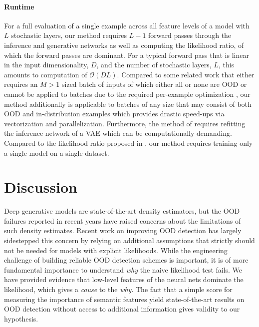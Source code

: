 {\paragraph{Runtime} For a full evaluation of a single example across all feature levels of a model with $L$ stochastic layers, our method requires $L-1$ forward passes through the inference and generative networks as well as computing the likelihood ratio, of which the forward passes are dominant.
For a typical forward pass that is linear in the input dimensionality, $D$, and the number of stochastic layers, $L$, this amounts to computation of $\mathcal{O}(DL)$.
Compared to some related work that either requires an $M>1$ sized batch of inputs of which either all or none are OOD \parencite{nalisnick_detecting_2019} or cannot be applied to batches due to the required per-example optimization \parencite{xiao_likelihood_2020}, our method additionally is applicable to batches of any size that may consist of both OOD and in-distribution examples which provides drastic speed-ups via vectorization and parallelization.
Furthermore, the method of \textcite{xiao_fashionmnist_2017} requires refitting the inference network of a VAE which can be computationally demanding.
Compared to the likelihood ratio proposed in \textcite{ren_likelihood_2019}, our method requires training only a single model on a single dataset.


\section{Discussion}
Deep generative models are state-of-the-art density estimators, but the OOD failures reported in recent years have raised concerns about the limitations of such density estimates. Recent work on improving OOD detection has largely sidestepped this concern by relying on additional assumptions that strictly should not be needed for models with explicit likelihoods.
While the engineering challenge of building reliable OOD detection schemes is important, it is of more fundamental importance to understand \emph{why} the naive likelihood test fails.
We have provided evidence that low-level features of the neural nets dominate the likelihood, which gives a \emph{cause} to the \emph{why}.
The fact that a simple score for measuring the importance of semantic features yield state-of-the-art results on OOD detection without access to additional information gives validity to our hypothesis.

}
